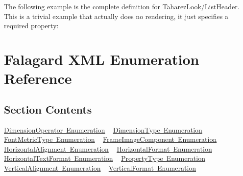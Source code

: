 The following example is the complete definition for \textquotesingle{}Taharez\+Look/\+List\+Header\textquotesingle{}. This is a trivial example that actually does no rendering, it just specifies a required property\+: 
\begin{DoxyCode}{0}
\DoxyCodeLine{  />}
\end{DoxyCode}
 \hypertarget{fal_enum_ref}{}\section{Falagard X\+ML Enumeration Reference}\label{fal_enum_ref}
\hypertarget{fal_enum_ref_fal_enum_ref_sec_0}{}\subsection{Section Contents}\label{fal_enum_ref_fal_enum_ref_sec_0}
\mbox{\hyperlink{fal_enum_ref_fal_enum_ref_sec_1}{Dimension\+Operator Enumeration}} ~\newline
 \mbox{\hyperlink{fal_enum_ref_fal_enum_ref_sec_2}{Dimension\+Type Enumeration}} ~\newline
 \mbox{\hyperlink{fal_enum_ref_fal_enum_ref_sec_3}{Font\+Metric\+Type Enumeration}} ~\newline
 \mbox{\hyperlink{fal_enum_ref_fal_enum_ref_sec_4}{Frame\+Image\+Component Enumeration}} ~\newline
 \mbox{\hyperlink{fal_enum_ref_fal_enum_ref_sec_5}{Horizontal\+Alignment Enumeration}} ~\newline
 \mbox{\hyperlink{fal_enum_ref_fal_enum_ref_sec_6}{Horizontal\+Format Enumeration}} ~\newline
 \mbox{\hyperlink{fal_enum_ref_fal_enum_ref_sec_7}{Horizontal\+Text\+Format Enumeration}} ~\newline
 \mbox{\hyperlink{fal_enum_ref_fal_enum_ref_sec_8}{Property\+Type Enumeration}} ~\newline
 \mbox{\hyperlink{fal_enum_ref_fal_enum_ref_sec_9}{Vertical\+Alignment Enumeration}} ~\newline
 \mbox{\hyperlink{fal_enum_ref_fal_enum_ref_sec_10}{Vertical\+Format Enumeration}} ~\newline
